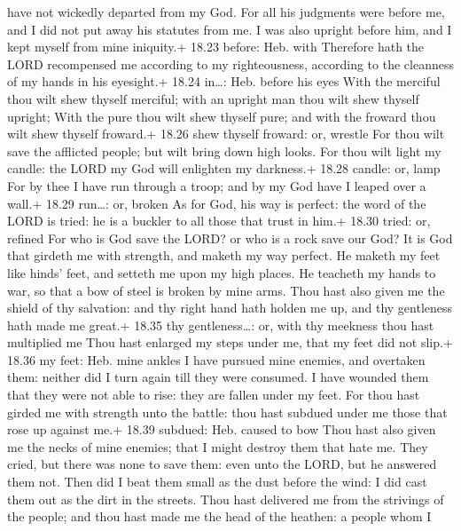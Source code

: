 have not wickedly departed from my God.  For all his
judgments were before me, and I did not put away his statutes from me.
 I was also upright before him, and I kept myself from mine
iniquity.+ 18.23 before: Heb. with  Therefore hath the LORD
recompensed me according to my righteousness, according to the cleanness
of my hands in his eyesight.+ 18.24 in\ldots: Heb. before his eyes
 With the merciful thou wilt shew thyself merciful; with an
upright man thou wilt shew thyself upright;  With the pure
thou wilt shew thyself pure; and with the froward thou wilt shew thyself
froward.+ 18.26 shew thyself froward: or, wrestle  For thou
wilt save the afflicted people; but wilt bring down high looks.
 For thou wilt light my candle: the LORD my God will
enlighten my darkness.+ 18.28 candle: or, lamp  For by thee
I have run through a troop; and by my God have I leaped over a wall.+
18.29 run\ldots: or, broken  As for God, his way is
perfect: the word of the LORD is tried: he is a buckler to all those
that trust in him.+ 18.30 tried: or, refined  For who is
God save the LORD? or who is a rock save our God?  It is
God that girdeth me with strength, and maketh my way perfect.
 He maketh my feet like hinds' feet, and setteth me upon my
high places.  He teacheth my hands to war, so that a bow of
steel is broken by mine arms.  Thou hast also given me the
shield of thy salvation: and thy right hand hath holden me up, and thy
gentleness hath made me great.+ 18.35 thy gentleness\ldots: or, with thy
meekness thou hast multiplied me  Thou hast enlarged my
steps under me, that my feet did not slip.+ 18.36 my feet: Heb. mine
ankles  I have pursued mine enemies, and overtaken them:
neither did I turn again till they were consumed.  I have
wounded them that they were not able to rise: they are fallen under my
feet.  For thou hast girded me with strength unto the
battle: thou hast subdued under me those that rose up against me.+ 18.39
subdued: Heb. caused to bow  Thou hast also given me the
necks of mine enemies; that I might destroy them that hate me.
 They cried, but there was none to save them: even unto the
LORD, but he answered them not.  Then did I beat them small
as the dust before the wind: I did cast them out as the dirt in the
streets.  Thou hast delivered me from the strivings of the
people; and thou hast made me the head of the heathen: a people whom I
